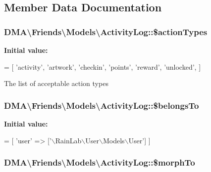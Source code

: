 \subsection{Member Data Documentation}
\hypertarget{classDMA_1_1Friends_1_1Models_1_1ActivityLog_aa60b5fe0e1e7c254827bfa35c69aef9d}{
\subsubsection[{\$action\-Types}]{\setlength{\rightskip}{0pt plus 5cm}D\-M\-A\textbackslash{}\-Friends\textbackslash{}\-Models\textbackslash{}\-Activity\-Log\-::\$action\-Types}}\label{classDMA_1_1Friends_1_1Models_1_1ActivityLog_aa60b5fe0e1e7c254827bfa35c69aef9d}
{\bfseries Initial value\-:}
\begin{DoxyCode}
= [
        \textcolor{stringliteral}{'activity'},
        \textcolor{stringliteral}{'artwork'},
        \textcolor{stringliteral}{'checkin'},
        \textcolor{stringliteral}{'points'},
        \textcolor{stringliteral}{'reward'},
        \textcolor{stringliteral}{'unlocked'},
    ]
\end{DoxyCode}
The list of acceptable action types \hypertarget{classDMA_1_1Friends_1_1Models_1_1ActivityLog_aff637d41ffa73260e1ffc1788f5a98d7}{
\subsubsection[{\$belongs\-To}]{\setlength{\rightskip}{0pt plus 5cm}D\-M\-A\textbackslash{}\-Friends\textbackslash{}\-Models\textbackslash{}\-Activity\-Log\-::\$belongs\-To}}\label{classDMA_1_1Friends_1_1Models_1_1ActivityLog_aff637d41ffa73260e1ffc1788f5a98d7}
{\bfseries Initial value\-:}
\begin{DoxyCode}
= [
        \textcolor{stringliteral}{'user'} => [\textcolor{stringliteral}{'\(\backslash\)RainLab\(\backslash\)User\(\backslash\)Models\(\backslash\)User'}]
    ]
\end{DoxyCode}
\hypertarget{classDMA_1_1Friends_1_1Models_1_1ActivityLog_afaa82849e3e93bf41ac948658ac652ff}{
\subsubsection[{\$morph\-To}]{\setlength{\rightskip}{0pt plus 5cm}D\-M\-A\textbackslash{}\-Friends\textbackslash{}\-Models\textbackslash{}\-Activity\-Log\-::\$morph\-To}}\label{classDMA_1_1Friends_1_1Models_1_1ActivityLog_afaa82849e3e93bf41ac948658ac652ff}
